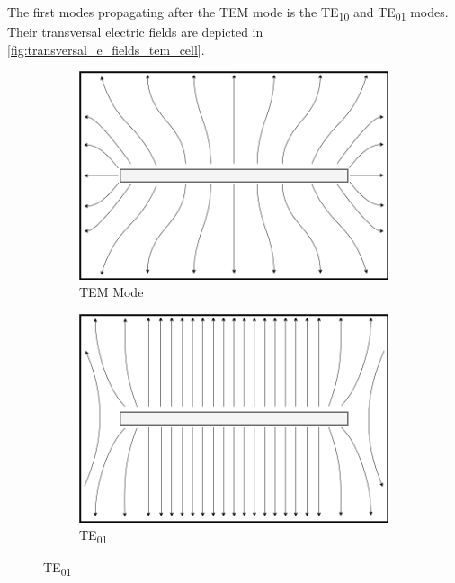 The first modes propagating after the TEM mode is the TE\textsubscript{10} and TE\textsubscript{01} modes. Their transversal electric fields are depicted in \autoref{fig:transversal_e_fields_tem_cell}. 

\begin{figure}[h]
    \centering
    \begin{subfigure}[b]{0.3\linewidth}
        \centering
        \includegraphics[width=\linewidth]{Documentation/content/10_theory/img/tem_cell_mode.png}
        \caption{TEM Mode}
        \label{fig:tem_mode}
    \end{subfigure}
    \begin{subfigure}[b]{0.3\linewidth}
        \centering
        \includegraphics[width=\linewidth]{Documentation/content/10_theory/img/te01_mode.png}
        \caption{TE\textsubscript{01}}
        \label{fig:te01_mode}
    \end{subfigure}

\end{figure}
